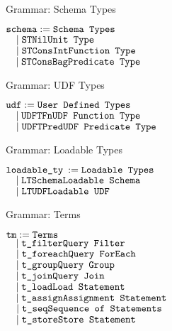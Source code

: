 \begin{frame}{Grammar: Schema Types}
\centering
	\begin{flushleft}
	$ \texttt{schema} := \hfill \texttt{Schema Types}\hfill$\\
	$ \quad \mid \texttt{STNil}\hfill \texttt{{Unit Type}}\hfill$\\
   	$ \quad \mid \texttt{STConsInt} \hfill \texttt{Function Type}\hfill$\\
    $ \quad \mid \texttt{STConsBag} \hfill \texttt{Predicate Type}\hfill$\\
	\end{flushleft}
\end{frame}

\begin{frame}{Grammar: UDF Types}
\centering
	\begin{flushleft}
	$ \texttt{udf} := \hfill \texttt{User Defined Types}\hfill$\\
	$ \quad \mid \texttt{UDFTFn}\hfill \texttt{UDF Function Type}\hfill$\\
   	$ \quad \mid \texttt{UDFTPred} \hfill \texttt{UDF Predicate Type}\hfill$\\
	\end{flushleft}
\end{frame}

\begin{frame}{Grammar: Loadable Types}
\centering
	\begin{flushleft}
	$ \texttt{loadable\_ty} \::= \hfill \texttt{Loadable Types}\hfill$\\
	$ \quad \mid \texttt{LTSchema}\hfill \texttt{Loadable Schema}\hfill$\\
   	$ \quad \mid \texttt{LTUDF} \hfill \texttt{Loadable UDF}\hfill$\\
	\end{flushleft}
\end{frame}

\begin{frame}{Grammar: Terms}
\centering
	\begin{flushleft}
	$ \texttt{tm} := \hfill \texttt{Terms}\hfill$\\
	$ \quad \mid \texttt{t\_filter}\hfill \texttt{Query Filter}\hfill$\\
   	$ \quad \mid \texttt{t\_foreach} \hfill \texttt{Query ForEach}\hfill$\\
    $ \quad \mid \texttt{t\_group} \hfill \texttt{Query Group}\hfill$\\
    $ \quad \mid \texttt{t\_join} \hfill \texttt{Query Join}\hfill$\\
    $ \quad \mid \texttt{t\_load} \hfill \texttt{Load Statement}\hfill$\\
   	$ \quad \mid \texttt{t\_assign} \hfill \texttt{Assignment Statement}\hfill$\\
    $ \quad \mid \texttt{t\_seq} \hfill \texttt{Sequence of Statements}\hfill$\\
    $ \quad \mid \texttt{t\_store} \hfill \texttt{Store Statement}\hfill$\\
	\end{flushleft}
\end{frame}

